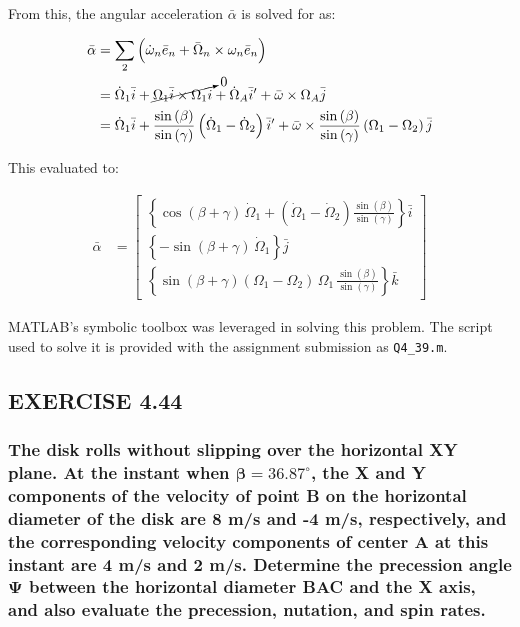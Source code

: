 \documentclass[12pt, letterpaper]{../assignment}
\begin{document}
From this, the angular acceleration $\bar{\alpha}$ is solved for as:

\begin{equation*}
    \begin{aligned}
        \bar{\alpha} &= \sum_2 \left( \dot{\omega}_n \bar{e}_n + \bar{\Omega}_n \times \omega_n \bar{e}_n \right)\\
        &= \dot{\Omega}_1 \bar{i} +
        \cancelto{0}{\Omega_1 \bar{i} \times \Omega_1 \bar{i}} +
        \dot{\Omega}_A \bar{i}' +
        \bar{\omega} \times \Omega_A \bar{j}\\
        &= \dot{\Omega}_1 \bar{i} +
        \frac{\sin\left(\beta \right)}{\sin\left(\gamma \right)} \left(\dot{\Omega}_{1}-\dot{\Omega}_{2}\right) \bar{i}' +
        \bar{\omega} \times \frac{\sin\left(\beta \right)}{\sin\left(\gamma \right)} \left(\Omega _{1}-\Omega _{2}\right) \bar{j}
    \end{aligned}
\end{equation*}

This evaluated to:
\begin{answer}
\begin{equation*}
    \begin{aligned}
        \bar{\alpha} &=
        \left[\begin{array}{r}
            \left\{\cos\left(\beta +\gamma \right)\,\dot{\Omega} _{1}+\left(\dot{\Omega}_{1}-\dot{\Omega}_{2}\right)\frac{\sin\left(\beta \right)}{\sin\left(\gamma \right)}\right\} \bar{i} \\
            \left\{-\sin\left(\beta +\gamma \right)\,\dot{\Omega} _{1}\right\} \bar{j} \\
            \left\{\sin\left(\beta +\gamma \right)\left(\Omega _{1}-\Omega _{2}\right)\,\Omega _{1}\,\frac{\sin\left(\beta \right)}{\sin\left(\gamma \right)}\right\} \bar{k} \end{array}\right]
    \end{aligned}
\end{equation*}
\end{answer}

MATLAB's symbolic toolbox was leveraged in solving this problem.
The script used to solve it is provided with the assignment submission as \texttt{Q4\_39.m}.


\subsection*{EXERCISE 4.44}
\subsubsection*{The disk rolls without slipping over the horizontal XY plane.
At the instant when $\bm{\beta = 36.87^\circ}$,
the X and Y components of the velocity of point B on the horizontal diameter of the disk are 8 m/s and -4 m/s,
respectively, and the corresponding velocity components of center A at this instant are 4 m/s and 2 m/s.
Determine the precession angle $\bm{\Psi}$ between the horizontal diameter BAC and the X axis,
and also evaluate the precession, nutation, and spin rates.}
\end{document}
